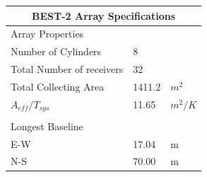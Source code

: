 \documentclass[useAMS,macros,usenatbib]{mn2e}
\begin{document}
\begin{table}
      \centering
      \begin{tabular}{| l | l | l |}
      \hline
      \multicolumn{3}{|c|}{BEST-2 Array Specifications}\\
      \hline
      Array Properties		&            &            	\\
      \hline
      Number of Cylinders 		&          8 &            	\\
      Total Number of receivers 		&         32 &            	\\
      Total Collecting Area 		&     1411.2 &        $m^2$ 	\\
      $A_{eff}/T_{sys}$ 		&      11.65 &      $m^2/K$ 	\\
				      &            &            	\\
      \hline
      Longest Baseline 		&            &            	\\
      \hline
      E-W 				&      17.04 &         m 	\\
      N-S 				&      70.00 &         m 	\\

\end{tabular}
\end{table}
\end{document}
